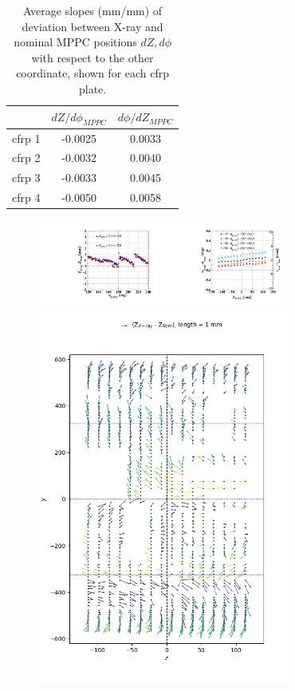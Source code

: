 \begin{table}
\begin{tabular}{ccc}
   & $dZ/d\phi_{MPPC}$ & $d\phi/dZ_{MPPC}$ \\
\hline 
cfrp 1 & -0.0025 & 0.0033 \\
cfrp 2 & -0.0032 & 0.0040 \\
cfrp 3 & -0.0033 & 0.0045 \\
cfrp 4 & -0.0050 & 0.0058 \\
\end{tabular}
\caption{Average slopes (mm/mm) of deviation between X-ray and nominal MPPC positions
$dZ, d\phi$ with respect to the other coordinate, shown for each 
cfrp plate.
}
\label{tab:rotation}
\end{table}

\begin{figure}
\includegraphics[width=4cm]{plots/dz_boardrotation.pdf}
\includegraphics[width=4cm]{plots/dphi_boardrotation.pdf}\\
\includegraphics[width=8.3cm]{plots/dzdy2017_rx.png}

\end{figure}
